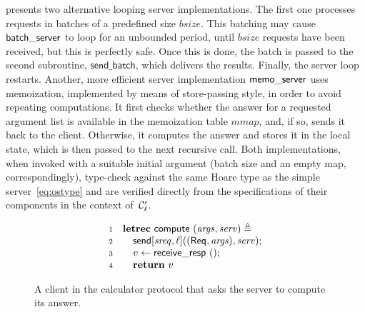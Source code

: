  presents two alternative looping server
implementations.
%
The first one processes requests in batches of a predefined size
$\mathit{bsize}$.
%
This batching may cause $\mathsf{batch\_server}$ to loop for an unbounded period, until
$\mathit{bsize}$ requests have been received, but this is perfectly
safe.
%
%
Once this is done, the batch is passed to the second subroutine,
$\mathsf{send\_batch}$, which delivers the results. Finally, the
server loop restarts.
%
Another, more efficient server implementation $\mathsf{memo\_server}$ uses memoization, implemented by means
of store-passing style, in order to avoid repeating computations. It
first checks whether the answer for a requested argument list is
available in the memoization table $\mathit{mmap}$, and, if so, sends
it back to the client. Otherwise, it computes the answer and stores it
in the local state, which is then passed to the next recursive call.
%
Both implementations, when invoked with a suitable initial argument
(batch size and an empty map, correspondingly), type-check against the
same Hoare type as the simple server~\eqref{eq:ostype} and are
verified directly from the specifications of their components in the
context of~$\mathcal{C}'_{\ell}$.


\begin{figure}
\[
\begin{array}{ll}
\num{1} & \letrecz~\cclient~(\args, \serv) \triangleq \\
\num{2} & \spa \acts[\trans{sreq},\lab]((\treq, \args), \serv);  \\
\num{3} & \spa v \asgn \blockresp~();  \\
\num{4} & \spa \retz~v  \\
\end{array}
\]
\caption{A client in the calculator protocol that asks the server to compute its answer.}
\label{fig:compute}
\end{figure}
%
